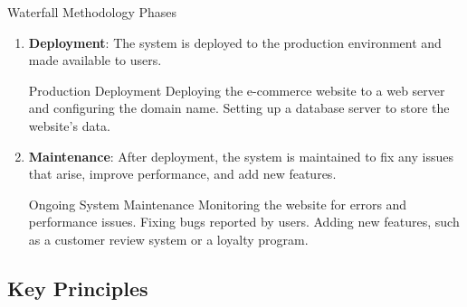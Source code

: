 \begin{conceptcard}{Waterfall Methodology Phases}
\begin{enumerate}
    \item \textbf{Deployment}: The system is deployed to the production environment and made available to users.

          \begin{examplecard}{Production Deployment}
            Deploying the e-commerce website to a web server and configuring the domain name. Setting up a database server to store the website's data.
          \end{examplecard}

    \item \textbf{Maintenance}: After deployment, the system is maintained to fix any issues that arise, improve performance, and add new features.

          \begin{examplecard}{Ongoing System Maintenance}
            Monitoring the website for errors and performance issues. Fixing bugs reported by users. Adding new features, such as a customer review system or a loyalty program.
          \end{examplecard}
  \end{enumerate}
\end{conceptcard}

\subsection{Key Principles}

